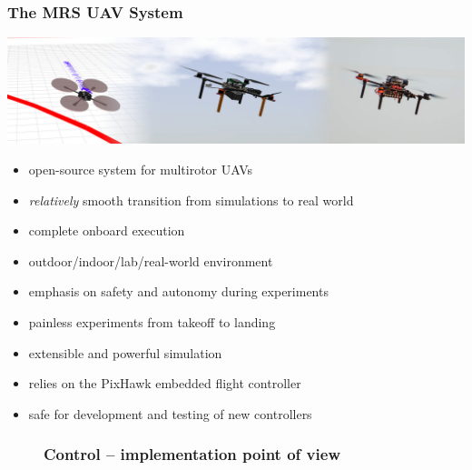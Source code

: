 \documentclass[aspectratio=1610]{beamer}
\begin{document}
  \begin{frame}
    \frametitle{The MRS UAV System}

    \vspace{-0.33em}

    \includegraphics[width=1.0\textwidth]{./fig/drone_collage.jpg}

    \vspace{-0.6em}

    \begin{itemize}
      \item open-source system for multirotor UAVs
      \item \emph{relatively} smooth transition from simulations to real world
      \item complete onboard execution
      \item outdoor/indoor/lab/real-world environment
      \item emphasis on safety and autonomy during experiments
      \item painless experiments from takeoff to landing
      \item extensible and powerful simulation
      \item relies on the PixHawk embedded flight controller
      \item safe for development and testing of new controllers
    \end{itemize}

  \end{frame}


  \begin{frame}
    \centering
    \begin{figure}

      \frametitle{Control -- implementation point of view}

      \begin{adjustbox}{max totalsize={1.0\textwidth}{.90\textheight}, center}
        
      \end{adjustbox}

    \end{figure}

  \end{frame}
\end{document}
